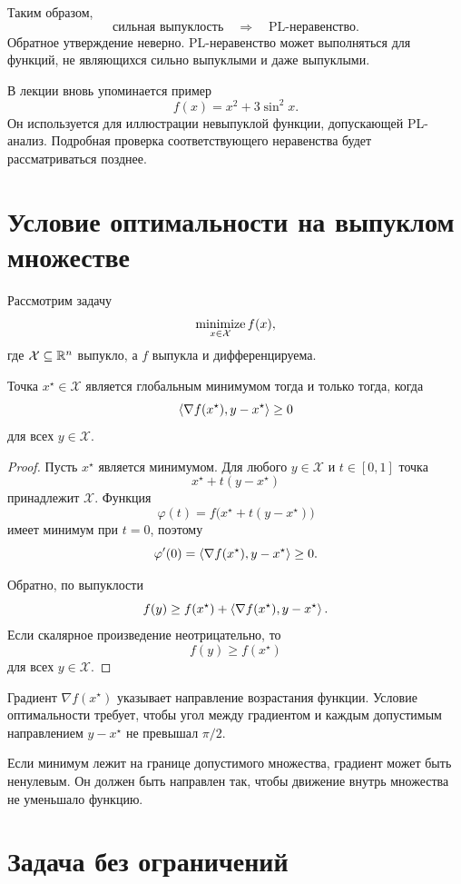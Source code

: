 Таким образом,
\[
    \text{сильная выпуклость}
    \quad\Longrightarrow\quad
    \text{PL-неравенство}.
\]
Обратное утверждение неверно. PL-неравенство может выполняться для
функций, не являющихся сильно выпуклыми и даже выпуклыми.

В лекции вновь упоминается пример
\[
    f(x)=x^2+3\sin^2x.
\]
Он используется для иллюстрации невыпуклой функции, допускающей
PL-анализ. Подробная проверка соответствующего неравенства будет
рассматриваться позднее.

\section{Условие оптимальности на выпуклом множестве}

Рассмотрим задачу
\[
    \operatorname*{minimize}_{x\in\mathcal X}f(x),
\]
где \(\mathcal X\subseteq\mathbb{R}^n\) выпукло, а \(f\) выпукла и
дифференцируема.

\begin{theorem}
Точка \(x^\star\in\mathcal X\) является глобальным минимумом тогда и
только тогда, когда
\[
    \left\langle \nabla f(x^\star),y-x^\star \right\rangle
    \ge0
\]
для всех \(y\in\mathcal X\).
\end{theorem}

\begin{proof}
Пусть \(x^\star\) является минимумом. Для любого \(y\in\mathcal X\)
и \(t\in[0,1]\) точка
\[
    x^\star+t(y-x^\star)
\]
принадлежит \(\mathcal X\). Функция
\[
    \varphi(t)
    =
    f\bigl(x^\star+t(y-x^\star)\bigr)
\]
имеет минимум при \(t=0\), поэтому
\[
    \varphi'(0)
    =
    \left\langle \nabla f(x^\star),y-x^\star \right\rangle
    \ge0.
\]

Обратно, по выпуклости
\[
    f(y)
    \ge
    f(x^\star)
    +
    \left\langle \nabla f(x^\star),y-x^\star \right\rangle.
\]
Если скалярное произведение неотрицательно, то
\[
    f(y)\ge f(x^\star)
\]
для всех \(y\in\mathcal X\).
\end{proof}

Градиент \(\nabla f(x^\star)\) указывает направление возрастания
функции. Условие оптимальности требует, чтобы угол между градиентом и каждым
допустимым направлением \(y-x^\star\) не превышал \(\pi/2\).

Если минимум лежит на границе допустимого множества, градиент может
быть ненулевым. Он должен быть направлен так, чтобы движение внутрь
множества не уменьшало функцию.

\section{Задача без ограничений}

